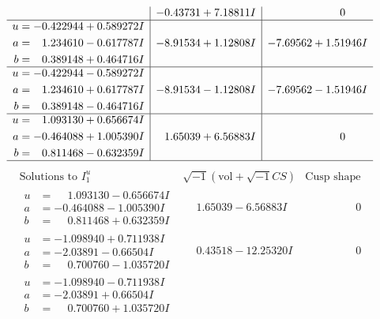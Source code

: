 \documentclass[1p]{elsarticle_modified}
\theoremstyle{definition}
\newcommand{\I}{\sqrt{-1}}
\begin{document}
$$\begin{array}{c|c|c}
 & -0.43731 + 7.18811 I & \phantom{-0.000000 } 0 \\ \hline\begin{aligned}
u &= -0.422944 + 0.589272 I \\
a &= \phantom{-}1.234610 - 0.617787 I \\
b &= \phantom{-}0.389148 + 0.464716 I\end{aligned}
 & -8.91534 + 1.12808 I & -7.69562 + 1.51946 I \\ \hline\begin{aligned}
u &= -0.422944 - 0.589272 I \\
a &= \phantom{-}1.234610 + 0.617787 I \\
b &= \phantom{-}0.389148 - 0.464716 I\end{aligned}
 & -8.91534 - 1.12808 I & -7.69562 - 1.51946 I \\ \hline\begin{aligned}
u &= \phantom{-}1.093130 + 0.656674 I \\
a &= -0.464088 + 1.005390 I \\
b &= \phantom{-}0.811468 - 0.632359 I\end{aligned}
 & \phantom{-}1.65039 + 6.56883 I & \phantom{-0.000000 } 0\\
 \hline 
 \end{array}$$\newpage$$\begin{array}{c|c|c}  
\text{Solutions to }I^u_{1}& \I (\text{vol} + \sqrt{-1}CS) & \text{Cusp shape}\\
 \hline 
\begin{aligned}
u &= \phantom{-}1.093130 - 0.656674 I \\
a &= -0.464088 - 1.005390 I \\
b &= \phantom{-}0.811468 + 0.632359 I\end{aligned}
 & \phantom{-}1.65039 - 6.56883 I & \phantom{-0.000000 } 0 \\ \hline\begin{aligned}
u &= -1.098940 + 0.711938 I \\
a &= -2.03891 - 0.66504 I \\
b &= \phantom{-}0.700760 - 1.035720 I\end{aligned}
 & \phantom{-}0.43518 - 12.25320 I & \phantom{-0.000000 } 0 \\ \hline\begin{aligned}
u &= -1.098940 - 0.711938 I \\
a &= -2.03891 + 0.66504 I \\
b &= \phantom{-}0.700760 + 1.035720 I\end{aligned}

\end{array}$$
\end{document}
